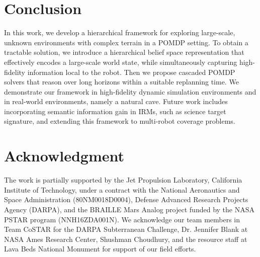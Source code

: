 \documentclass[letterpaper]{article} %
\begin{document}
\section{Conclusion}\label{sec:conclusion}
In this work, we develop a hierarchical framework for exploring large-scale, unknown environments with complex terrain in a POMDP setting. 
To obtain a tractable solution, we introduce a hierarchical belief space representation that effectively encodes a large-scale world state, while simultaneously capturing high-fidelity information local to the robot. Then we propose cascaded POMDP solvers that reason over long horizons within a suitable replanning time. 
We demonstrate our framework in high-fidelity dynamic simulation environments and in real-world environments, namely a natural cave.  
%
Future work includes incorporating semantic information gain in IRMs, such as science target signature,
and extending this framework to multi-robot coverage problems.

\vspace{-10pt}

\section*{Acknowledgment}
The work is partially supported by the Jet Propulsion Laboratory, California Institute of Technology, under a contract with the National Aeronautics and Space Administration (80NM0018D0004), Defense Advanced Research Projects Agency (DARPA), and the BRAILLE Mars Analog project funded by the NASA PSTAR program (NNH16ZDA001N).
We acknowledge our team members in Team CoSTAR for the DARPA Subterranean Challenge, Dr. Jennifer Blank at NASA Ames Research Center, Shushman Choudhury, and the resource staff at Lava Beds National Monument for support of our field efforts.
\vspace{-10pt}


\end{document}

